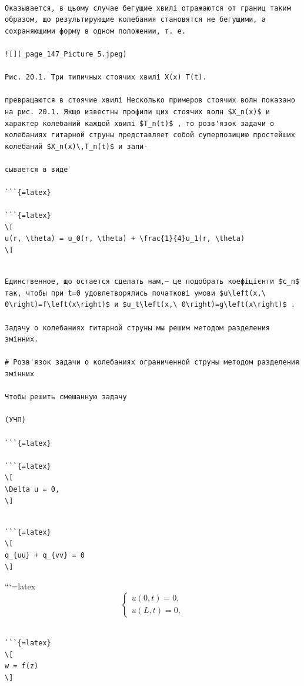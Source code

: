 \documentclass[
  ukrainian,
]{article}
\begin{document}
\begin{verbatim}

Оказывается, в цьому случае бегущие хвилі отражаются от границ таким образом, що результирующие колебания становятся не бегущими, а сохраняющими форму в одном положении, т. е.

![](_page_147_Picture_5.jpeg)

Рис. 20.1. Три типичных стоячих хвилі X(x) T(t).

превращаются в стоячие хвилі Несколько примеров стоячих волн показано на рис. 20.1. Якщо известны профили цих стоячих волн $X_n(x)$ и характер колебаний каждой хвилі $T_n(t)$ , то розв'язок задачи о колебаниях гитарной струны представляет собой суперпозицию простейших колебаний $X_n(x)\,T_n(t)$ и запи-

сывается в виде

```{=latex}

```{=latex}
\[
u(r, \theta) = u_0(r, \theta) + \frac{1}{4}u_1(r, \theta)
\]
\end{verbatim}

\begin{verbatim}

Единственное, що остается сделать нам,— це подобрать коефіцієнти $c_n$ так, чтобы при t=0 удовлетворялись початкові умови $u\left(x,\ 0\right)=f\left(x\right)$ и $u_t\left(x,\ 0\right)=g\left(x\right)$ .

Задачу о колебаниях гитарной струны мы решим методом разделения змінних.

# Розв'язок задачи о колебаниях ограниченной струны методом разделения змінних

Чтобы решить смешанную задачу

(УЧП)

```{=latex}

```{=latex}
\[
\Delta u = 0,
\]
\end{verbatim}

\begin{verbatim}

```{=latex}
\[
q_{uu} + q_{vv} = 0
\]
\end{verbatim}

```{=latex}
\[
\begin{cases} u(0, t) = 0, \\ u(L, t) = 0, \end{cases}
\]

\begin{verbatim}

```{=latex}
\[
w = f(z)
\]
\end{verbatim}
\end{document}
